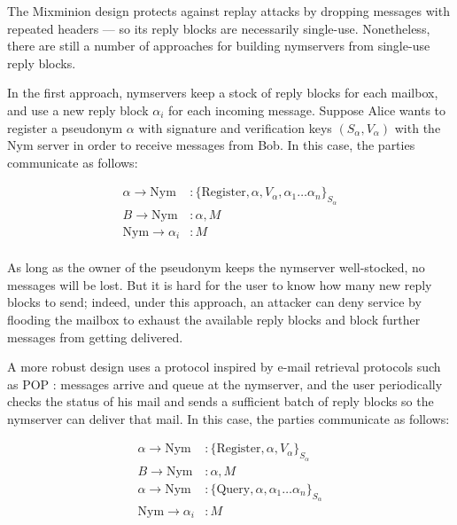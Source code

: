\documentclass[final]{ieee}
\begin{document}
The Mixminion design protects against replay attacks by dropping messages
with repeated headers --- so its reply blocks are necessarily
single-use. Nonetheless, there are still a number of approaches for building
nymservers from single-use reply blocks.

In the first approach, nymservers keep a stock of reply blocks for
each mailbox, and use a new reply block $\alpha_i$ for each incoming message. 
Suppose Alice wants to register a pseudonym $\alpha$ with signature and
verification keys $(S_\alpha,V_\alpha)$ with the Nym server in order
to receive messages from Bob.  In this case, the parties communicate as
follows: 

\begin{equation}
\begin{aligned}
\alpha \rightarrow \mathrm{Nym}&: \{\mathrm{Register} , \alpha, V_{\alpha}, \alpha_1 \dots
\alpha_n\}_{S_\alpha} \\ 
B \rightarrow \mathrm{Nym}&: \alpha, M \\ 
\mathrm{Nym} \rightarrow \alpha_i&: M \\
\end{aligned}
\end{equation}

As long
as the owner of the pseudonym keeps the nymserver well-stocked, no
messages will be lost.  But it is hard for the user to know how many
new reply blocks to send; indeed, under this approach, an attacker can
deny service by flooding the mailbox to exhaust the available
reply blocks and block further messages from getting delivered.

A more robust design uses a protocol inspired by e-mail retrieval
protocols such as POP \cite{POP3}:
messages arrive and queue at the nymserver, and the user periodically
checks the status of his mail and sends a sufficient batch of reply
blocks so the nymserver can deliver that mail.  In this case, the parties
communicate as follows:

\begin{equation}
\begin{aligned}
\alpha \rightarrow \mathrm{Nym}&: \{\mathrm{Register} , \alpha, V_{\alpha}\}_{S_{\alpha}}\\
B \rightarrow \mathrm{Nym}&: \alpha, M \\
\alpha \rightarrow \mathrm{Nym}&: \{\mathrm{Query} ,\alpha, \alpha_1 \dots
\alpha_n\}_{S_{\alpha}} \\
\mathrm{Nym} \rightarrow \alpha_i&: M
\end{aligned}
\end{equation}
\end{document}
